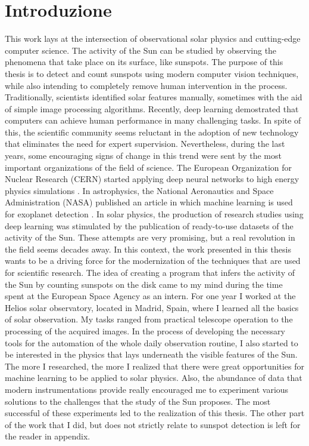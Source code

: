\chapter{Introduzione}
\label{Introduction}
\thispagestyle{empty}

\noindent This work lays at the intersection of observational solar physics and cutting-edge computer science. The activity of the Sun can be studied by observing the phenomena that take place on its surface, like sunspots. The purpose of this thesis is to detect and count sunspots using modern computer vision techniques, while also intending to completely remove human intervention in the process.
\bigbreak
\noindent Traditionally, scientists identified solar features manually, sometimes with the aid of simple image processing algorithms. Recently, deep learning demostrated that computers can achieve human performance in many challenging tasks. In spite of this, the scientific community seems reluctant in the adoption of new technology that eliminates the need for expert supervision. Nevertheless, during the last years, some encouraging signs of change in this trend were sent by the most important organizations of the field of science.
\bigbreak
\noindent The European Organization for Nuclear Research (CERN) started applying deep neural networks to high energy physics simulations \cite{de2017learning}. In astrophysics, the National Aeronautics and Space Administration (NASA) published an article in which machine learning is used for exoplanet detection \cite{shallue2018identifying}. In solar physics, the production of research studies using deep learning was stimulated by the publication of ready-to-use datasets \cite{McGregor2017} of the activity of the Sun. These attempts are very promising, but a real revolution in the field seems decades away. In this context, the work presented in this thesis wants to be a driving force for the modernization of the techniques that are used for scientific research.
\bigbreak
\noindent The idea of creating a program that infers the activity of the Sun by counting sunspots on the disk came to my mind during the time spent at the European Space Agency as an intern. For one year I worked at the Helios solar observatory, located in Madrid, Spain, where I learned all the basics of solar observation. My tasks ranged from practical telescope operation to the processing of the acquired images. In the process of developing the necessary tools for the automation of the whole daily observation routine, I also started to be interested in the physics that lays underneath the visible features of the Sun. The more I researched, the more I realized that there were great opportunities for machine learning to be applied to solar physics. Also, the abundance of data that modern instrumentations provide really encouraged me to experiment various solutions to the challenges that the study of the Sun proposes. The most successful of these experiments led to the realization of this thesis. The other part of the work that I did, but does not strictly relate to sunspot detection is left for the reader in appendix.
